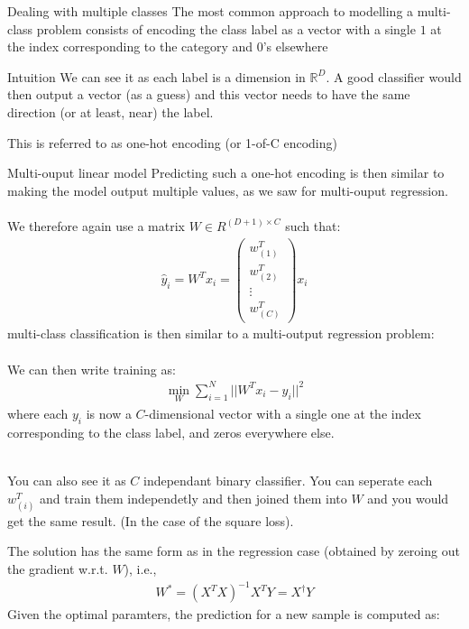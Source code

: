 \begin{parag}{Dealing with multiple classes}
    The most common approach to modelling a multi-class problem consists of encoding the class label as a vector with a single $1$ at the index corresponding to the category and 0's elsewhere
	\begin{subparag}{Intuition}
	    We can see it as each label is a dimension in $\mathbb{R}^{D}$. A good classifier would then output a vector (as a guess) and this vector needs to have the same direction (or at least, near) the label.
	\end{subparag}
	This is referred to as one-hot encoding (or 1-of-C encoding)
\end{parag}
\begin{parag}{Multi-ouput linear model}
    Predicting such a one-hot encoding is then similar to making the model output multiple values, as we saw for multi-ouput regression.\\
	$ $\\
	We therefore again use a matrix $W \in R^{\left(D + 1\right)\times C}$ such that:
	\begin{align*} 
		\hat{y}_i  = W^{T}x_i = \begin{pmatrix} w_{\left(1\right)}^{T} \\ w_{\left(2\right)}^{T} \\ \vdots \\ w_{\left(C\right)}^{T} \end{pmatrix} x_i
	\end{align*}
	multi-class classification is then similar to a multi-output regression problem:\\
	$ $\\
	We can then write training as:
	\begin{align*} 
		\min_W \sum_{i= 1}^{N} ||W^{T}x_i - y_i||^2
	\end{align*}
	where each $y_i$ is now a $C$-dimensional vector with a single one at the index corresponding to the class label, and zeros everywhere else.

	\begin{framedremark}
		$ $\\
	You can also see it as $C$ independant binary classifier. You can seperate each $w_{\left(i\right)}^{T}$ and train them independetly and then joined them into $W$ and you would get the same result. (In the case of the square loss).
	\end{framedremark}
	The solution has the same form as in the regression case (obtained by zeroing out the gradient w.r.t. $W$), i.e.,
	\begin{align*} 
		W^{\ast} = \left(X^{T}X\right)^{-1}X^{T}Y =  X^{\dagger}Y
	\end{align*}
	Given the optimal paramters, the prediction for a new sample is computed as:


\end{parag}
